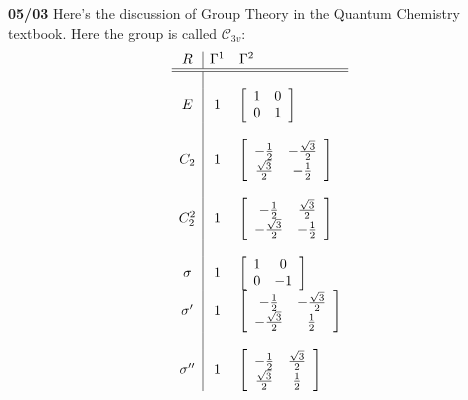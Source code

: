 \documentclass[12pt]{article}
\begin{document}
{\noindent \textbf{05/03} Here's the discussion of Group Theory in the Quantum Chemistry textbook.  Here the group is called $\mathcal{C}_{3v}$:
$$ \begin{array}{c|cl} 
R & \Gamma^1 & \Gamma^2 \\  \hline \hline \\
E & 1 & \left[  \begin{array}{cc} 1 & 0 \\ 0 & 1 \end{array} \right]\\ \\
C_2 & 1 & \left[  \begin{array}{cc} -\frac{1}{2} & -\frac{\sqrt{3}}{2} \\ \frac{\sqrt{3}}{2} & -\frac{1}{2} \end{array} \right]\\ \\
C_2^2 & 1 & \left[  \begin{array}{cc} -\frac{1}{2} & \frac{\sqrt{3}}{2} \\ - \frac{\sqrt{3}}{2} & -\frac{1}{2} \end{array} \right] \\ \\
\sigma & 1 & \left[  \begin{array}{cc} 1 & 0 \\ 0 & -1 \end{array} \right] \\
\sigma'& 1 & \left[  \begin{array}{cc} -\frac{1}{2} & 
- \frac{\sqrt{3}}{2} \\ - \frac{\sqrt{3}}{2} & \frac{1}{2} \end{array} \right] \\ \\
\sigma''& 1 & 
\left[ \begin{array}{cc} - \frac{1}{2} & \frac{\sqrt{3}}{2} \\ \frac{\sqrt{3}}{2} & \frac{1}{2} \end{array} \right] 

\end{array} $$


}
\end{document}
